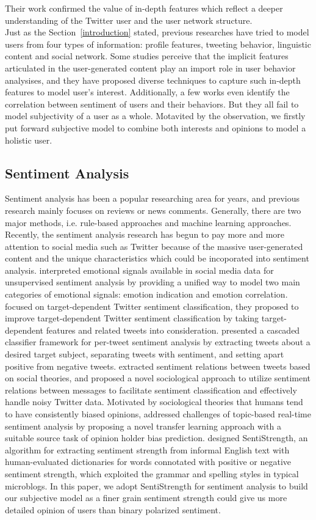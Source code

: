 \documentclass{acm_proc_article-sp}
\begin{document}
Their work confirmed the value of in-depth features which reflect a deeper understanding of the Twitter user and the user network structure.\\
Just as the Section~\ref{introduction} stated, previous researches have tried to model users from four types of information: profile features, tweeting behavior, linguistic content and social network. 
Some studies perceive that the implicit features articulated in the user-generated content play an import role in user behavior analysises,  and they have proposed diverse techniques to capture such in-depth features to model user's interest. 
Additionally, a few works even identify the correlation between sentiment of users and their behaviors.
But they all fail to model subjectivity of a user as a whole.
Motavited by the observation, we firstly put forward subjective model to combine both interests and opinions to model a holistic user. 
\subsection{Sentiment Analysis}
Sentiment analysis has been a popular researching area for years, and previous research mainly focuses on reviews or news comments. 
Generally, there are two major methods, i.e. rule-based approaches and machine learning approaches. 
Recently, the sentiment analysis research has begun to pay more and more attention to social media such as Twitter because of the massive user-generated content and the unique characteristics which could be incoporated into sentiment analysis. 
\cite{Hu:2013www} interpreted emotional signals available in social media data for unsupervised sentiment analysis by providing a unified way to model two main categories of emotional signals: emotion indication and emotion correlation. 
\cite{Jiang:2011TTS} focused on target-dependent Twitter sentiment classification, they proposed to improve target-dependent Twitter sentiment classification by taking target-dependent features and related tweets into consideration. 
\cite{AsiaeeT:2012} presented a cascaded classifier framework for per-tweet sentiment analysis by extracting tweets about a desired target subject, separating tweets with sentiment, and setting apart positive from negative tweets.
\cite{Hu:2013ESR} extracted sentiment relations between tweets based on social theories, and proposed a novel sociological approach to utilize sentiment relations between messages to facilitate sentiment classification and effectively handle noisy Twitter data.
Motivated by sociological theories that humans tend to have consistently biased opinions, \cite{CalaisGuerra:2011BOT} addressed challenges of topic-based real-time sentiment analysis by proposing a novel transfer learning approach with a suitable source task of opinion holder bias prediction.
\cite{Thelwall:2010SSS,Thelwall:2012SSD} designed SentiStrength, an algorithm for extracting sentiment strength from informal English text with human-evaluated dictionaries for words connotated with positive or negative sentiment strength, which exploited the grammar and spelling styles in typical microblogs.
In this paper, we adopt SentiStrength for sentiment analysis to build our subjective model as a finer grain sentiment strength could give us more detailed opinion of users than binary polarized sentiment.
\end{document}
